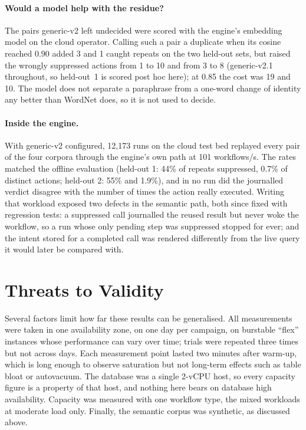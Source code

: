 \paragraph{Would a model help with the residue?} The pairs generic-v2 left
undecided were scored with the engine's embedding model on the cloud
operator. Calling such a pair a duplicate when its cosine reached 0.90 added
3 and 1 caught repeats on the two held-out sets, but raised the wrongly
suppressed actions from 1 to 10 and from 3 to 8 (generic-v2.1 throughout,
so held-out~1 is scored post hoc here); at 0.85 the cost was 19
and 10. The model does not separate a paraphrase from a one-word change of
identity any better than WordNet does, so it is not used to decide.

\paragraph{Inside the engine.} With generic-v2 configured, 12,173
 runs on the cloud test bed replayed every pair of the four
corpora through the engine's own path at 101 workflows/s. The rates matched
the offline evaluation (held-out 1: 44\% of repeats suppressed, 0.7\% of
distinct actions; held-out 2: 55\% and 1.9\%), and in no run did the
journalled verdict disagree with the number of times the action really
executed. Writing that workload exposed two defects in the semantic path,
both since fixed with regression tests: a suppressed call journalled the
reused result but never woke the workflow, so a run whose only pending step
was suppressed stopped for ever; and the intent stored for a completed call
was rendered differently from the live query it would later be compared
with.

\section{Threats to Validity}
\label{sec:validity}

Several factors limit how far these results can be generalised. All
measurements were taken in one availability zone, on one day per campaign,
on burstable ``flex'' instances whose performance can vary over time; trials
were repeated three times but not across days. Each measurement point lasted
two minutes after warm-up, which is long enough to observe saturation but not
long-term effects such as table bloat or autovacuum. The database was a
single 2-vCPU host, so every capacity figure is a property of that host, and
nothing here bears on database high availability. Capacity was measured
with one workflow type, the mixed workloads at moderate load only. Finally, the semantic corpus was synthetic, as discussed
above.

